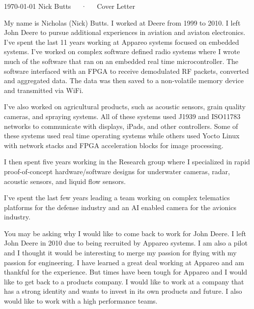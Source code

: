 \documentclass[11pt, a4paper]{awesome-cv}
\begin{document}
\makecvheader[R]

\makecvfooter
  {\today}
  {Nick Butts~~~·~~~Cover Letter}
  {}

\makelettertitle

\begin{cvletter}

My name is Nicholas (Nick) Butts. I worked at Deere from 1999 to 2010. I left John Deere to pursue additional experiences in aviation and aviaton electronics. I've spent the last 11 years working at Appareo systems focused on embedded systems. I've worked on complex software defined radio systems where I wrote much of the software that ran on an embedded real time microcontroller. The software interfaced with an FPGA to receive demodulated RF packets, converted and aggregated data. The data was then saved to a non-volatile memory device and transmitted via WiFi.

I've also worked on agricultural products, such as acoustic sensors, grain quality cameras, and spraying systems. All of these systems used J1939 and ISO11783 networks to communicate with displays, iPads, and other controllers. Some of these systems used real time operating systems while others used Yocto Linux with network stacks and FPGA acceleration blocks for image processing.

I then spent five years working in the Research group where I specialized in rapid proof-of-concept hardware/software designs for underwater cameras, radar, acoustic sensors, and liquid flow sensors.

I've spent the last few years leading a team working on complex telematics platforms for the defense industry and an AI enabled camera for the avionics industry.

You may be asking why I would like to come back to work for John Deere. I left John Deere in 2010 due to being recruited by Appareo systems. I am also a pilot and I thought it would be interesting to merge my passion for flying with my passion for engineering. I have learned a great deal working at Appareo and am thankful for the experience. But times have been tough for Appareo and I would like to get back to a products company. I would like to work at a company that has a strong identity and wants to invest in its own products and future. I also would like to work with a high performance teams.


\end{cvletter}
\end{document}
